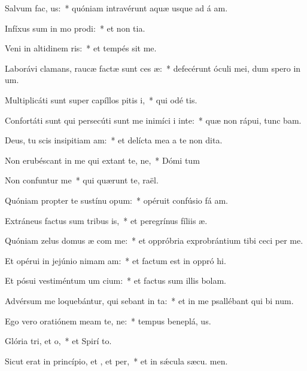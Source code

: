 \item Salvum  fac, us:~* quóniam intravérunt aquæ usque ad á am.
\item Infíxus sum in mo prodi:~* et non  tia.
\item Veni in altidinem ris:~* et tempés sit me.
\item Laborávi clamans, raucæ factæ sunt ces æ:~* defecérunt óculi mei, dum spero in  um.
\item Multiplicáti sunt super capíllos pitis i,~* qui odé  tis.
\item Confortáti sunt qui persecúti sunt me inimíci i inte:~* quæ non rápui, tunc bam.
\item Deus, tu scis insipitiam am:~* et delícta mea a te non  dita.
\item Non erubéscant in me qui extant te, ne,~* Dómi tum
\item Non confuntur  me~* qui quærunt te,  raël.
\item Quóniam propter te sustínu opum:~* opéruit confúsio fá am.
\item Extráneus factus sum tribus is,~* et peregrínus fíliis  æ.
\item Quóniam zelus domus æ com me:~* et oppróbria exprobrántium tibi ceci per me.
\item Et opérui in jejúnio nimam am:~* et factum est in oppró hi.
\item Et pósui vestiméntum um cium:~* et factus sum illis  bolam.
\item Advérsum me loquebántur, qui sebant in ta:~* et in me psallébant qui bi num.
\item Ego vero oratiónem meam  te, ne:~* tempus beneplá, us.
\item Glória tri, et o,~* et Spirí to.
\item Sicut erat in princípio, et , et per,~* et in sǽcula sæcu. men.

